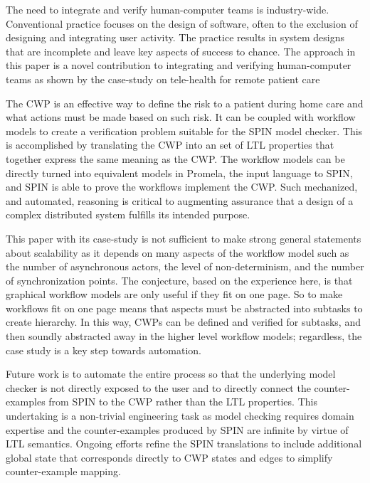 The need to integrate and verify human-computer teams is industry-wide. Conventional practice focuses on the design of software, often to the exclusion of designing and integrating user activity. The practice results in system designs that are incomplete and leave key aspects of success to chance. The approach in this paper is a novel contribution to integrating and verifying human-computer teams as shown by the case-study on tele-health for remote patient care 

The CWP is an effective way to define the risk to a patient during home care and what actions must be made based on such risk. It can be coupled with workflow models to create a verification problem suitable for the SPIN model checker. This is accomplished by translating the CWP into an set of LTL properties that together express the same meaning as the CWP. The workflow models can be directly turned into equivalent models in Promela, the input language to SPIN, and SPIN is able to prove the workflows implement the CWP. Such mechanized, and automated, reasoning is critical to augmenting assurance that a design of a complex distributed system fulfills its intended purpose. 

This paper with its case-study is not sufficient to make strong general statements about scalability as it depends on many aspects of the workflow model such as the number of asynchronous actors, the level of non-determinism, and the number of synchronization points. The conjecture, based on the experience here, is that graphical workflow models are only useful if they fit on one page. So to make workflows fit on one page means that aspects must be abstracted into subtasks to create hierarchy. In this way, CWPs can be defined and verified for subtasks, and then soundly abstracted away in the higher level workflow models; regardless, the case study is a key step towards automation. 

Future work is to automate the entire process so that the underlying model checker is not directly exposed to the user and to directly connect the counter-examples from SPIN to the CWP rather than the LTL properties. This undertaking is a non-trivial engineering task as model checking requires domain expertise and the counter-examples produced by SPIN are infinite by virtue of LTL semantics. Ongoing efforts refine the SPIN translations to include additional global state that corresponds directly to CWP states and edges to simplify counter-example mapping.
